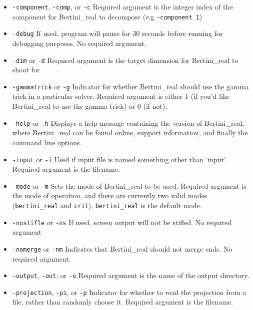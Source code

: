 \documentclass[10pt]{article}
\begin{document}
\begin {itemize}
\item \texttt{-component}, \texttt{-comp}, or \texttt{-c} \newline Required argument is the integer index of the component for Bertini\_real to decompose (e.g \texttt{-component 1})
\item \texttt{-debug} \newline If used, program will pause for 30 seconds before running for debugging purposes. No required argument.
\item \texttt{-dim} or \texttt{-d} \newline Required argument is the target dimension for Bertini\_real to shoot for
\item \texttt{-gammatrick} or \texttt{-g} \newline Indicator for whether Bertini\_real should use the gamma trick in a particular solver. Required argument is either 1 (if you'd like Bertini\_real to use the gamma trick) or 0 (if not).
\item \texttt{-help}  or \texttt{-h} \newline Displays a help message containing the version of Bertini\_real, where Bertini\_real can be found online, support information, and finally the command line options.
\item \texttt{-input}  or \texttt {-i} \newline Used if input file is named something other than `input'. Required argument is the filename. 
\item \texttt{-mode} or \texttt{-m} \newline Sets the mode of Bertini\_real to be used. Required argument is the mode of operation, and there are currently two valid modes (\texttt{bertini\_real} and \texttt{crit}). \texttt{bertini\_real} is the default mode. 
\item \texttt{-nostifle} or \texttt{-ns} \newline If used, screen output will not be stifled. No required argument
\item \texttt{-nomerge} or \texttt{-nm} \newline Indicates that Bertini\_real should not merge ends. No required argument.
\item \texttt{-output}, \texttt{-out}, or \texttt{-o} \newline Required argument is the name of the output directory.
\item \texttt{-projection}, \texttt{-pi}, or \texttt{-p} \newline Indicator for whether to read the projection from a file, rather than randomly choose it. Required argument is the filename. 

\end{itemize}
\end{document}
